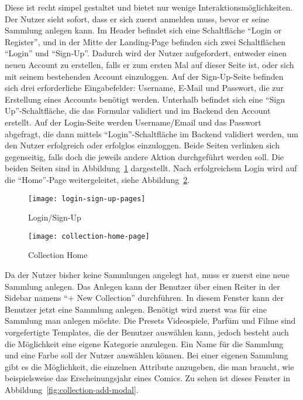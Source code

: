 Diese ist recht simpel gestaltet und bietet nur wenige Interaktionsmöglichkeiten.
Der Nutzer sieht sofort, dass er sich zuerst anmelden muss, bevor er seine Sammlung anlegen kann.
Im Header befindet sich eine Schaltfläche ``Login or Register'', und in der Mitte der Landing-Page befinden sich zwei Schaltflächen ``Login'' und ``Sign-Up''.
Dadurch wird der Nutzer aufgefordert, entweder einen neuen Account zu erstellen, falls er zum ersten Mal auf dieser Seite ist, oder sich mit seinem bestehenden Account einzuloggen.
\newpage
Auf der Sign-Up-Seite befinden sich drei erforderliche Eingabefelder: Username, E-Mail und Passwort, die zur Erstellung eines Accounts benötigt werden.
Unterhalb befindet sich eine ``Sign Up''-Schaltfläche, die das Formular validiert und im Backend den Account erstellt.
Auf der Login-Seite werden Username/Email und das Passwort abgefragt, die dann mittels ``Login''-Schaltfläche im Backend validiert werden, um den Nutzer erfolgreich oder erfolglos einzuloggen.
Beide Seiten verlinken sich gegenseitig, falls doch die jeweils andere Aktion durchgeführt werden soll.
Die beiden Seiten sind in Abbildung~\ref{fig:login-sign-up-pages} dargestellt.
Nach erfolgreichem Login wird auf die ``Home''-Page weitergeleitet, siehe Abbildung~\ref{fig:collection-home-page}.

\begin{figure}[h]
    \centering
    \texttt{[image: login-sign-up-pages]}
    \caption{Login/Sign-Up}
    \label{fig:login-sign-up-pages}
\end{figure}

\begin{figure}[h]
    \centering
    \texttt{[image: collection-home-page]}
    \caption{Collection Home}
    \label{fig:collection-home-page}
\end{figure}

\newpage

Da der Nutzer bisher keine Sammlungen angelegt hat, muss er zuerst eine neue Sammlung anlegen.
Das Anlegen kann der Benutzer über einen Reiter in der Sidebar namens ``+ New Collection'' durchführen.
In diesem Fenster kann der Benutzer jetzt eine Sammlung anlegen.
Benötigt wird zuerst was für eine Sammlung man anlegen möchte.
Die Presets Videospiele, Parfüm und Filme sind vorgefertigte Templates, die der Benutzer auswählen kann, jedoch besteht auch die Möglichkeit eine eigene Kategorie anzulegen.
Ein Name für die Sammlung und eine Farbe soll der Nutzer auswählen können.
Bei einer eigenen Sammlung gibt es die Möglichkeit, die einzelnen Attribute anzugeben, die man braucht, wie beispielsweise das Erscheinungsjahr eines Comics.
Zu sehen ist dieses Fenster in Abbildung~\ref{fig:collection-add-modal}.

